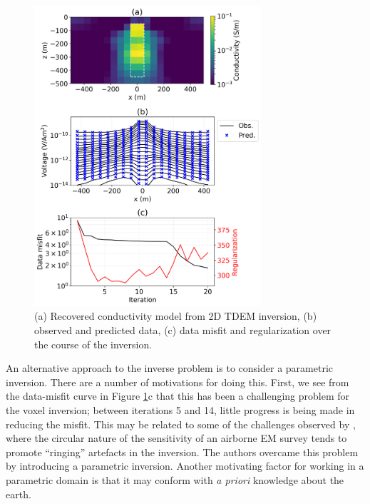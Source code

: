 \documentclass[paper]{geophysics}
\begin{document}
\begin{figure}[!htb]
  \centering
  \includegraphics[width=0.75\textwidth]{figures/2Dvoxel_inversion.png}
  \caption{(a) Recovered conductivity model from 2D TDEM inversion, (b) observed and predicted data, (c) data misfit and regularization over the course of the inversion.}
  \label{fig:2Dvoxel_inversion}
\end{figure}

An alternative approach to the inverse problem is to consider a parametric inversion. There are a number of motivations for doing this. First, we see from the data-misfit curve in Figure \ref{fig:2Dvoxel_inversion}c that this has been a challenging problem for the voxel inversion; between iterations 5 and 14, little progress is being made in reducing the misfit. This may be related to some of the challenges observed by \cite{mcmillan2015}, where the circular nature of the sensitivity of an airborne EM survey tends  to promote ``ringing'' artefacts in the inversion. The authors overcame this problem by introducing a parametric inversion. Another motivating factor for working in a parametric domain is that it may conform with \emph{a priori} knowledge about the earth.
\end{document}
